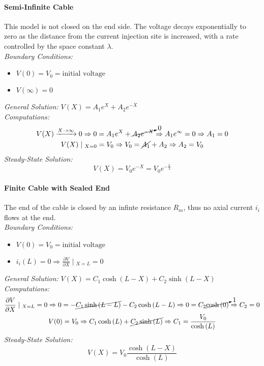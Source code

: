 \paragraph{Semi-Infinite Cable} This model is not closed on the end side. The voltage
decays exponentially to zero as the distance from the current injection site is increased,
with a rate controlled by the space constant \(\lambda\).\\
\textit{Boundary Conditions:}
\begin{itemize}
    \item \(V(0)=V_{0}=\text{initial voltage}\)
    \item \(V(\infty)=0\)
\end{itemize}
\textit{General Solution:} \(V(X)=A_{1}e^{X}+A_{2}e^{-X}\)\\
\textit{Computations:}
\begin{gather*}
    V(X)\xrightarrow{X\to{\infty}}{0}
    \Rightarrow{0=A_{1}e^{X}+\cancelto{0}{A_{2}e^{-X}}}
    \Rightarrow{A_{1}e^{\infty}=0}
    \Rightarrow{A_{1}=0}\\
    V(X)\mid{}_{X=0}=V_{0}
    \Rightarrow{V_{0}=\cancel{A_{1}}+A_{2}}
    \Rightarrow{A_{2}=V_{0}}
\end{gather*}
\textit{Steady-State Solution:}
\begin{equation*}
    V(X)=V_{0}e^{-X}=V_{0}e^{-\frac{x}{\lambda}}
\end{equation*}
\paragraph{Finite Cable with Sealed End} The end of the cable is closed by an infinte
resistance \(R_{m}\), thus no axial current \(i_{i}\) flows at the end.\\
\textit{Boundary Conditions:}
\begin{itemize}
    \item \(V(0)=V_{0}=\text{initial voltage}\)
    \item \(i_{i}(L)=0\Rightarrow{\frac{\partial{V}}{\partial{X}}\mid{}_{X=L}=0}\)
\end{itemize}
\textit{General Solution:} \(V(X)=C_{1}\cosh{(L-X)}+C_{2}\sinh{(L-X)}\)\\
\textit{Computations:}
\begin{gather*}
    \frac{\partial{V}}{\partial{X}}\mid{}_{X=L}=0
    \Rightarrow{0=-\cancel{C_{1}\sinh{(L-L)}}-C_{2}\cosh{(L-L)}}
    \Rightarrow{0=C_{2}\cancelto{1}{\cosh{(0)}}}
    \Rightarrow{C_{2}=0}\\
    V(0)=V_{0}
    \Rightarrow{C_{1}\cosh{(L)}+\cancel{C_{2}\sinh{(L)}}}
    \Rightarrow{C_{1}=\frac{V_{0}}{\cosh{(L)}}}
\end{gather*}
\textit{Steady-State Solution:}
\begin{equation*}
    V(X)=V_{0}\frac{\cosh{(L-X)}}{\cosh{(L)}}
\end{equation*}
